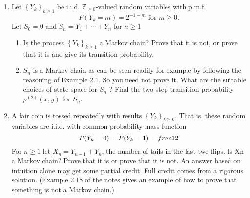 \documentclass{article} %
\theoremstyle{plain}
\newtheorem{theorem}{Theorem}
\theoremstyle{case}
\begin{document}
\begin{enumerate}[label={\fbox{\textbf{Exercise \#\arabic* :}}}]
  \newpage
  \item Let $\left\{Y_k\right\}_{k \geq 1}$ be i.i.d. $\mathbb{Z}_{\geq 0}$-valued random variables with p.m.f.
    \[
      P\left(Y_k=m\right)=2^{-1-m} \text { for } m \geq 0 .
      \]
    Let $S_0=0$ and $S_n=Y_1+\cdots+Y_n$ for $n \geq 1$
    \begin{enumerate}
      \item Is the process $\left\{Y_k\right\}_{k \geq 1}$ a Markov chain? Prove that it is not, or prove that it is and give its transition probability.
      \item  $S_n$ is a Markov chain as can be seen readily for example by following the reasoning of Example 2.1. So you need not prove it. What are the suitable choices of state space for $S_n$ ? Find the two-step transition probability $p^{(2)}(x, y)$ for $S_n$.
    \end{enumerate} 
  \newpage
  \item A fair coin is tossed repeatedly with results $\left\{Y_k\right\}_{k \geq 0}$. That is, these random variables are i.i.d.  with common
    probability mass function
    \[ P(Y_k=0) = P(Y_k =1) = \\frac{1}{2}  \]
    For $n \geq 1$ let $X_n = Y_{n-1} + Y_n$, the number of tails in the
    last two flips. Is Xn a Markov chain?
    Prove that it is or prove that it is not. An answer based on intuition
    alone may get some partial credit. Full credit comes from a rigorous
    solution. (Example 2.18 of the notes gives an example of how to prove
    that something is not a Markov chain.)
\end{enumerate}

%
%
%
\end{document}
